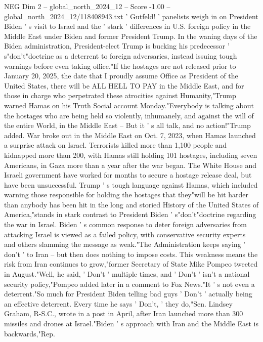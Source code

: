 \begin{textsample}{NEG Dim 2 – global\_north\_2024\_12 – Score -1.00 – global\_north\_2024\_12/118408943.txt}  \label{ex:f2_neg_260}
' Gutfeld! ' panelists weigh in on President Biden ' s visit to Israel and the ' stark ' differences in U.S. foreign policy in the Middle East under Biden and former President Trump.
In the waning days of the Biden administration, President-elect Trump is bucking his predecessor ' s"don't"doctrine as a deterrent to foreign adversaries, instead issuing tough warnings before even taking office."If the hostages are not released prior to January 20, 2025, the date that I proudly assume Office as President of the United States, there will be ALL HELL TO PAY in the Middle East, and for those in charge who perpetrated these atrocities against Humanity,"Trump warned Hamas on his Truth Social account Monday."Everybody is talking about the hostages who are being held so violently, inhumanely, and against the will of the entire World, in the Middle East -- But it ' s all talk, and no action!"Trump added.
War broke out in the Middle East on Oct. 7, 2023, when Hamas launched a surprise attack on Israel.
Terrorists killed more than 1,100 people and kidnapped more than 200, with Hamas still holding 101 hostages, including seven Americans, in Gaza more than a year after the war began.
The White House and Israeli government have worked for months to secure a hostage release deal, but have been unsuccessful.
Trump ' s tough language against Hamas, which included warning those responsible for holding the hostages that they"will be hit harder than anybody has been hit in the long and storied History of the United States of America,"stands in stark contrast to President Biden ' s"don't"doctrine regarding the war in Israel.
Biden ' s common response to deter foreign adversaries from attacking Israel is viewed as a failed policy, with conservative security experts and others slamming the message as weak."The Administration keeps saying ' don't ' to Iran -- but then does nothing to impose costs.
This weakness means the risk from Iran continues to grow,"former Secretary of State Mike Pompeo tweeted in August."Well, he said, ' Don't ' multiple times, and ' Don't ' isn't a national security policy,"Pompeo added later in a comment to Fox News."It ' s not even a deterrent."So much for President Biden telling bad guys ' Don't ' actually being an effective deterrent.
Every time he says ' Don't, ' they do,"Sen.
Lindsey Graham, R-S.C., wrote in a post in April, after Iran launched more than 300 missiles and drones at Israel."Biden ' s approach with Iran and the Middle East is backwards,"Rep.

\end{textsample}
